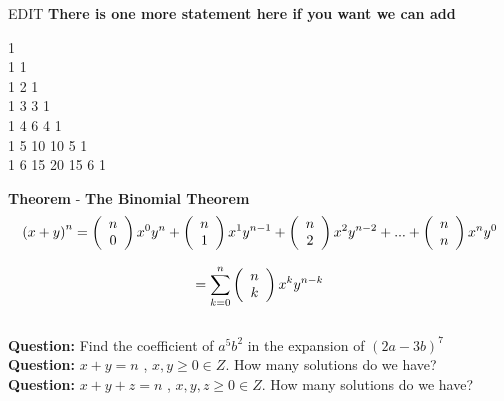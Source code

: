 \documentclass[11pt]{article}
\begin{document}
EDIT
\textbf{There is one more statement here if you want we can add}
\\

\begin{center}
1\\1 1\\1 2 1\\1 3 3 1\\1 4 6 4 1\\1 5 10 10 5 1\\1 6 15 20 15 6 1\\
\end{center}

\textbf{Theorem} - \textbf{The Binomial Theorem}
$$\left({x+y}\right)^n = \left( {\begin{array}{*{20}c} n  \\ 0  \\ \end{array}} \right) x^0 y^n +  \left( {\begin{array}{*{20}c} n  \\ 1  \\ \end{array}} \right) x^1 y^{n-1} + \left( {\begin{array}{*{20}c} n  \\ 2 \\ \end{array}} \right) x^2 y^{n-2} + ... + \left( {\begin{array}{*{20}c} n  \\ n \\ \end{array}} \right) x^n y^0$$

$$= \sum\limits_{k = 0}^n {\left( {\begin{array}{*{20}c} n  \\ k  \\ \end{array}} \right) x^k y^{n-k}}$$
\\

\textbf{Question: } Find the coefficient of $a^5b^2$ in the expansion of  $\left(2a-3b\right)^7$
\\ %

\textbf{Question: }  $x+y = n$ , $x,y \geq 0 \in Z$. How many solutions do we have? 
\\ %

\textbf{Question: }  $x+y+z = n$ , $x,y,z \geq 0 \in Z$. How many solutions do we have?
\\ %
\end{document}
